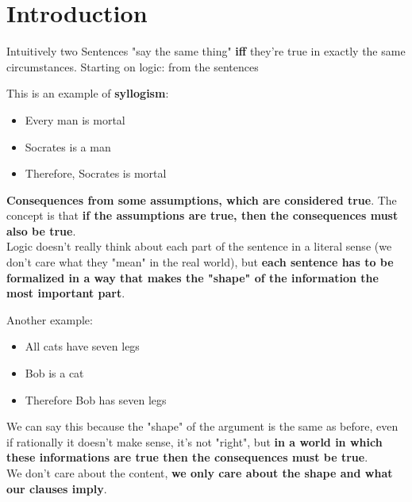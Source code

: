 
	\chapter{Introduction}


	Intuitively two Sentences "say the same thing" \textbf{iff} they're true in exactly the same circumstances.
	Starting on logic: from the sentences
	\begin{example} This is an example of \textbf{syllogism}:
	  \begin{itemize}
		\item Every man is mortal
		\item Socrates is a man
			  \\ \bline
		\item Therefore, Socrates is mortal
	  \end{itemize}
	\end{example}

	 \textbf{Consequences from some assumptions, which are considered true}.
	The concept is that \textbf{if the assumptions are true, then the consequences must also be true}. \\

	Logic doesn't really think about each part of the sentence in a literal sense (we don't care what they "mean" in the real world), but \textbf{each sentence has to be formalized in a way that makes the "shape" of the information the most important part}.

	\begin{example} Another example:
	  \begin{itemize}
		\item All cats have seven legs
		\item Bob is a cat
			  \\ \bline
		\item Therefore Bob has seven legs
	  \end{itemize}
	\end{example}

	We can say this because the "shape" of the argument is the same as before, even if rationally it doesn't make sense, it's not "right", but \textbf{in a world in which these informations are true then the consequences must be true}.\\

	We don't care about the content, \textbf{we only care about the shape and what our clauses imply}.

